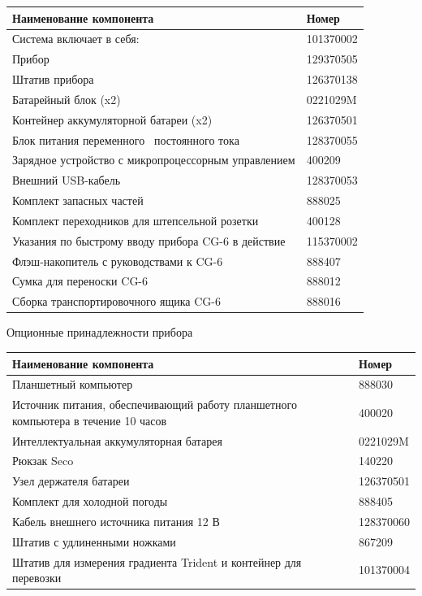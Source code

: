 \begin{longtable}{|p{}|p{}|}
  \hline
  Наименование компонента & Номер \\
  \hline
  Система \cg{} включает в себя: & 101370002 \\
  \hline
  Прибор \cg{} & 129370505 \\
  \hline
  Штатив прибора & 126370138 \\
  \hline
  Батарейный блок (x2) & 0221029M \\
  \hline
  Контейнер аккумуляторной батареи (x2) & 126370501 \\
  \hline
  Блок питания переменного \ постоянного тока & 128370055 \\
  \hline
  Зарядное устройство с микропроцессорным управлением & 400209 \\
  \hline
  Внешний USB-кабель & 128370053 \\
  \hline
  Комплект запасных частей & 888025 \\
  \hline
  Комплект переходников для штепсельной розетки & 400128 \\
  \hline
  Указания по быстрому вводу прибора CG-6 в действие & 115370002 \\
  \hline
  Флэш-накопитель с руководствами к CG-6 & 888407 \\
  \hline
  Сумка для переноски CG-6 & 888012 \\
  \hline
  Сборка транспортировочного ящика CG-6 & 888016 \\
  \hline
\end{longtable}

Опционные принадлежности прибора \cg{}

\begin{longtable}{|p{}|p{}|}
  \hline
  Наименование компонента & Номер \\
  \hline
  Планшетный компьютер & 888030 \\
  \hline
  Источник питания, обеспечивающий работу планшетного компьютера 
  в течение 10 часов & 400020 \\
  \hline
  Интеллектуальная аккумуляторная батарея & 0221029M \\
  \hline
  Рюкзак Seco & 140220 \\
  \hline
  Узел держателя батареи & 126370501 \\
  \hline
  Комплект для холодной погоды & 888405 \\
  \hline
  Кабель внешнего источника питания 12 В & 128370060 \\
  \hline
  Штатив с удлиненными ножками & 867209 \\
  \hline
  Штатив для измерения градиента Trident и контейнер для перевозки & 101370004 \\
  \hline
\end{longtable}

